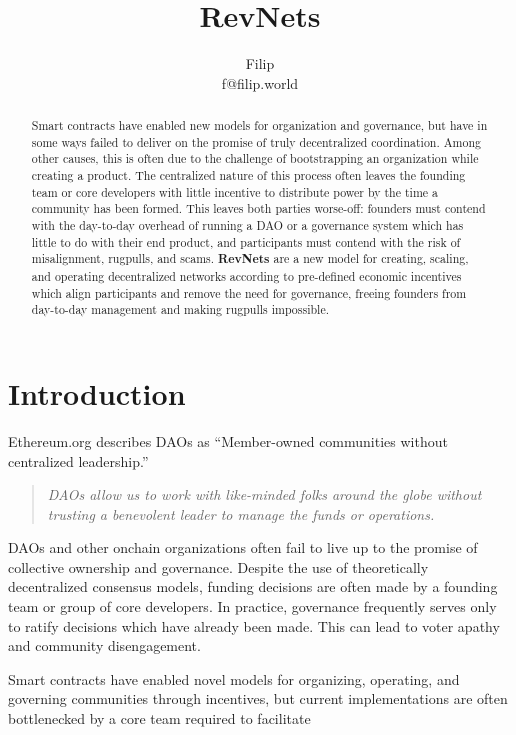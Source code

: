 \documentclass{article}
\title{RevNets}
\author{Filip\\f@filip.world}
\begin{document}
\maketitle

\begin{abstract}
  Smart contracts have enabled new models for organization and governance, but have in some ways failed to deliver on the promise of truly decentralized coordination. Among other causes, this is often due to the challenge of bootstrapping an organization while creating a product. The centralized nature of this process often leaves the founding team or core developers with little incentive to distribute power by the time a community has been formed. This leaves both parties worse-off: founders must contend with the day-to-day overhead of running a DAO or a governance system which has little to do with their end product, and participants must contend with the risk of misalignment, rugpulls, and scams. \textbf{RevNets} are a new model for creating, scaling, and operating decentralized networks according to pre-defined economic incentives which align participants and remove the need for governance, freeing founders from day-to-day management and making rugpulls impossible.
\end{abstract}

\section{Introduction}

Ethereum.org\cite{daos} describes DAOs as ``Member-owned communities without centralized leadership.''

\begin{quote}
  \textit{DAOs allow us to work with like-minded folks around the globe without trusting a benevolent leader to manage the funds or operations.}
\end{quote}

DAOs and other onchain organizations often fail to live up to the promise of collective ownership and governance. Despite the use of theoretically decentralized consensus models, funding decisions are often made by a founding team or group of core developers. In practice, governance frequently serves only to ratify decisions which have already been made. This can lead to voter apathy and community disengagement.

Smart contracts have enabled novel models for organizing, operating, and governing communities through incentives, but current implementations are often bottlenecked by a core team required to facilitate
\end{document}

